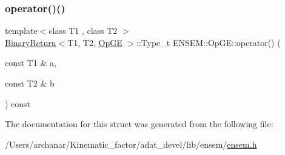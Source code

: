 \mbox{\label{structENSEM_1_1OpGE_ab43afee7152159c15cf9af4203049d4b}} 
\subsubsection{\texorpdfstring{operator()()}{operator()()}\hspace{0.1cm}{\footnotesize\ttfamily [2/2]}}
{\footnotesize\ttfamily template$<$class T1 , class T2 $>$ \\
\mbox{\hyperlink{structENSEM_1_1BinaryReturn}{Binary\+Return}}$<$T1, T2, \mbox{\hyperlink{structENSEM_1_1OpGE}{Op\+GE}} $>$\+::Type\+\_\+t E\+N\+S\+E\+M\+::\+Op\+G\+E\+::operator() (\begin{DoxyParamCaption}\item[{const T1 \&}]{a,  }\item[{const T2 \&}]{b }\end{DoxyParamCaption}) const\hspace{0.3cm}{\ttfamily [inline]}}



The documentation for this struct was generated from the following file\+:\begin{DoxyCompactItemize}
\item 
/\+Users/archanar/\+Kinematic\+\_\+factor/adat\+\_\+devel/lib/ensem/\mbox{\hyperlink{lib_2ensem_2ensem_8h}{ensem.\+h}}\end{DoxyCompactItemize}
